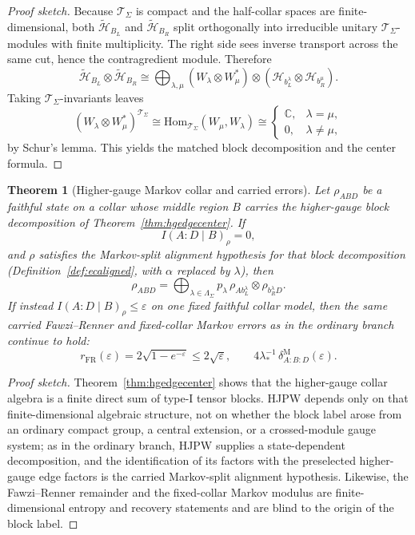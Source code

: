 \documentclass[11pt]{article}
\newtheorem{theorem}{Theorem}[section]
\begin{document}
\begin{proof}[Proof sketch]
Because \(\mathcal T_\Sigma\) is compact and the half-collar spaces are finite-dimensional, both \(\widetilde{\mathcal H}_{B_L}\) and \(\widetilde{\mathcal H}_{B_R}\) split orthogonally into irreducible unitary \(\mathcal T_\Sigma\)-modules with finite multiplicity. The right side sees inverse transport across the same cut, hence the contragredient module. Therefore
\[
\widetilde{\mathcal H}_{B_L}\otimes \widetilde{\mathcal H}_{B_R}
\cong
\bigoplus_{\lambda,\mu}
(W_\lambda\otimes W_\mu^*)\otimes
(\mathcal H_{b_L^\lambda}\otimes \mathcal H_{b_R^\mu}).
\]
Taking \(\mathcal T_\Sigma\)-invariants leaves
\[
(W_\lambda\otimes W_\mu^*)^{\mathcal T_\Sigma}
\cong
\mathrm{Hom}_{\mathcal T_\Sigma}(W_\mu,W_\lambda)
\cong
\begin{cases}
\mathbb C, & \lambda=\mu,\\
0, & \lambda\neq\mu,
\end{cases}
\]
by Schur's lemma. This yields the matched block decomposition and the center formula.
\end{proof}

\begin{theorem}[Higher-gauge Markov collar and carried errors]\label{thm:hgmarkov}
Let \(\rho_{ABD}\) be a faithful state on a collar whose middle region \(B\) carries the higher-gauge block decomposition of Theorem~\ref{thm:hgedgecenter}. If
\[
I(A:D\mid B)_\rho=0,
\]
and \(\rho\) satisfies the Markov-split alignment hypothesis for that block decomposition (Definition~\ref{def:ecaligned}, with \(\alpha\) replaced by \(\lambda\)), then
\[
\rho_{ABD}
=
\bigoplus_{\lambda\in\Lambda_\Sigma}
p_\lambda\,
\rho_{A b_L^\lambda}\otimes \rho_{b_R^\lambda D}.
\]
If instead \(I(A:D\mid B)_\rho\le \varepsilon\) on one fixed faithful collar model, then the same carried Fawzi--Renner and fixed-collar Markov errors as in the ordinary branch continue to hold:
\[
r_{\mathrm{FR}}(\varepsilon)=2\sqrt{1-e^{-\varepsilon}}\le 2\sqrt{\varepsilon},
\qquad
4\lambda_\ast^{-1}\,\delta^{\mathrm M}_{A:B:D}(\varepsilon).
\]
\end{theorem}

\begin{proof}[Proof sketch]
Theorem~\ref{thm:hgedgecenter} shows that the higher-gauge collar algebra is a finite direct sum of type-I tensor blocks. HJPW depends only on that finite-dimensional algebraic structure, not on whether the block label arose from an ordinary compact group, a central extension, or a crossed-module gauge system; as in the ordinary branch, HJPW supplies a state-dependent decomposition, and the identification of its factors with the preselected higher-gauge edge factors is the carried Markov-split alignment hypothesis. Likewise, the Fawzi--Renner remainder and the fixed-collar Markov modulus are finite-dimensional entropy and recovery statements and are blind to the origin of the block label.
\end{proof}
\end{document}
